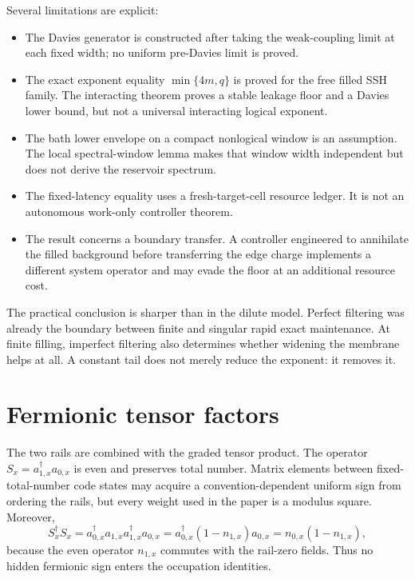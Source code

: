 \documentclass[11pt,a4paper]{article}
\theoremstyle{remark}
\begin{document}
Several limitations are explicit:
\begin{itemize}
\item The Davies generator is constructed after taking the weak-coupling limit at each fixed width; no uniform pre-Davies limit is proved.
\item The exact exponent equality $\min\{4m,q\}$ is proved for the free filled SSH family.  The interacting theorem proves a stable leakage floor and a Davies lower bound, but not a universal interacting logical exponent.
\item The bath lower envelope on a compact nonlogical window is an assumption.  The local spectral-window lemma makes that window width independent but does not derive the reservoir spectrum.
\item The fixed-latency equality uses a fresh-target-cell resource ledger.  It is not an autonomous work-only controller theorem.
\item The result concerns a boundary transfer.  A controller engineered to annihilate the filled background before transferring the edge charge implements a different system operator and may evade the floor at an additional resource cost.
\end{itemize}

The practical conclusion is sharper than in the dilute model.  Perfect filtering was already the boundary between finite and singular rapid exact maintenance.  At finite filling, imperfect filtering also determines whether widening the membrane helps at all.  A constant tail does not merely reduce the exponent: it removes it.

\appendix

\section{Fermionic tensor factors}

The two rails are combined with the graded tensor product.  The operator $S_x=a_{1,x}^\dagger a_{0,x}$ is even and preserves total number.  Matrix elements between fixed-total-number code states may acquire a convention-dependent uniform sign from ordering the rails, but every weight used in the paper is a modulus square.  Moreover,
\[
 S_x^\dagger S_x
 =a_{0,x}^\dagger a_{1,x}a_{1,x}^\dagger a_{0,x}
 =a_{0,x}^\dagger(1-n_{1,x})a_{0,x}
 =n_{0,x}(1-n_{1,x}),
\]
because the even operator $n_{1,x}$ commutes with the rail-zero fields.  Thus no hidden fermionic sign enters the occupation identities.
\end{document}
